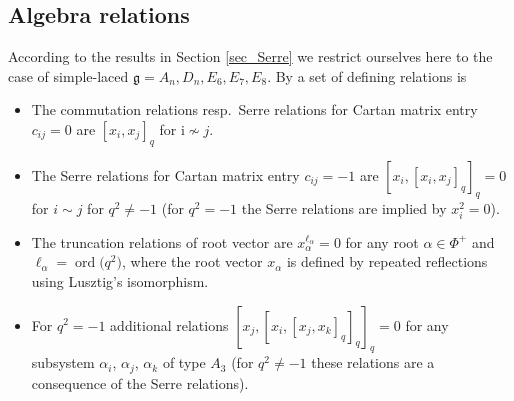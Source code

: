 \documentclass[10pt,a4paper]{amsart}
\numberwithin{equation}{section}
\renewcommand{\i}{\mathrm{i}}
\newcommand{\g}{\mathfrak{g}}
\begin{document}
\subsection{Algebra relations}\label{CartanNArel}

According to the results in Section \ref{sec_Serre} we restrict ourselves here to the case of simple-laced $\g=A_n,D_n,E_6,E_7,E_8$. By \cite[Sections~4.1, and~4.4 and~4.5]{AA17} a set of defining relations is
\begin{itemize}\itemsep=0pt
	\item The commutation relations resp.~Serre relations for Cartan matrix entry $c_{ij}=0$ are $[x_i,x_j]_q$ for $\i\not\sim j$.
	\item The Serre relations for Cartan matrix entry $c_{ij}=-1$ are $[x_i,[x_i,x_j]_q]_q=0$ for $i\sim j$ for $q^2\neq -1$ (for $q^2=-1$ the Serre relations are implied by $x_i^2=0$).
	\item The truncation relations of root vector are $x_\alpha^{\ell_\alpha}=0$ for any root $\alpha\in\Phi^+$ and $\ell_\alpha=\operatorname{ord}\big(q^{2}\big)$, where the root vector $x_\alpha$ is defined by repeated reflections using Lusztig's isomorphism.
	\item For $q^2=-1$ additional relations $[x_j,[x_i,[x_j,x_k]_q]_q]_q=0$ for any subsystem $\alpha_i$, $\alpha_j$, $\alpha_k$ of type $A_3$ (for $q^2\neq -1$ these relations are a consequence of the Serre relations).
\end{itemize}
\end{document}
